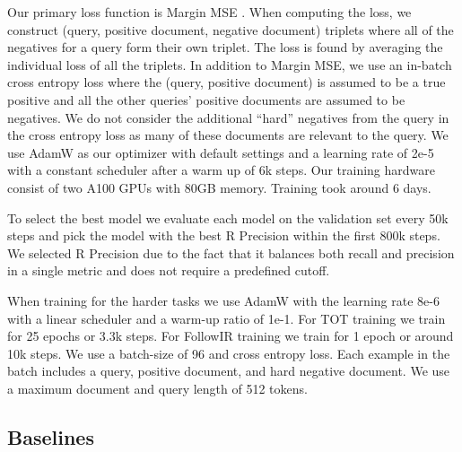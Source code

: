 \documentclass[sigconf,]{acmart}
\begin{document}
Our primary loss function is Margin MSE \cite{MarginMSE}. When computing the loss, we construct (query, positive document, negative document) triplets where all of the negatives for a query form their own triplet. The loss is found by averaging the individual loss of all the triplets. In addition to Margin MSE, we use an in-batch cross entropy loss where the (query, positive document) is assumed to be a true positive and all the other queries' positive documents are assumed to be negatives. We do not consider the additional ``hard'' negatives from the query in the cross entropy loss as many of these documents are relevant to the query. We use AdamW as our optimizer with default settings and a learning rate of 2e-5 with a constant scheduler after a warm up of 6k steps. Our training hardware consist of two A100 GPUs with 80GB memory. Training took around 6 days.

To select the best model we evaluate each model on the validation set every 50k steps and pick the model with the best R Precision within the first 800k steps. We selected R Precision due to the fact that it balances both recall and precision in a single metric and does not require a predefined cutoff.

When training for the harder tasks we use AdamW with the learning rate 8e-6 with a linear scheduler and a warm-up ratio of 1e-1. For TOT training we train for 25 epochs or 3.3k steps. For FollowIR training we train for 1 epoch or around 10k steps. We use a batch-size of 96 and cross entropy loss. Each example in the batch includes a query, positive document, and hard negative document. We use a maximum document and query length of 512 tokens.



\subsection{Baselines}
\end{document}
